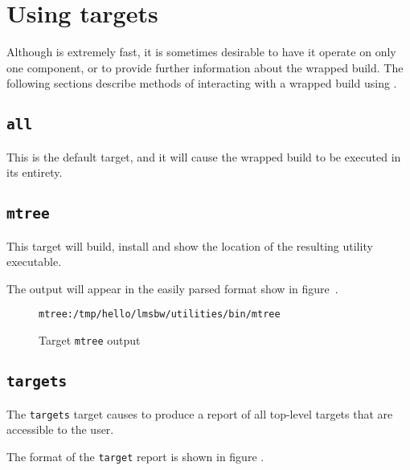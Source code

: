 \section{Using \lmsbw targets}\label{usinglmsbw:target:verbs}

Although \lmsbw is extremely fast, it is sometimes desirable to have
it operate on only one component, or to provide further information
about the wrapped build.  The following sections describe methods of
interacting with a wrapped build using \lmsbw.

\subsection{\texttt{all}}\label{usinglmsbw:target:all}

This is the default target, and it will cause the wrapped build to be
executed in its entirety.

\subsection{\texttt{mtree}}

This target will build, install and show the location of the resulting
\mtree utility executable.

The output will appear in the easily parsed format show in
figure~.

\begin{figure}[ht]
  \hrulefill
\begin{verbatim}
mtree:/tmp/hello/lmsbw/utilities/bin/mtree
\end{verbatim}
  \caption{Target \texttt{mtree} output}\label{usinglmsbw:mtree-output}
  \hrulefill
\end{figure}

\subsection{\texttt{targets}}

The \texttt{targets} target causes \lmsbw to produce a report of all
top-level targets that are accessible to the user.

The format of the \texttt{target} report is shown in figure
.

